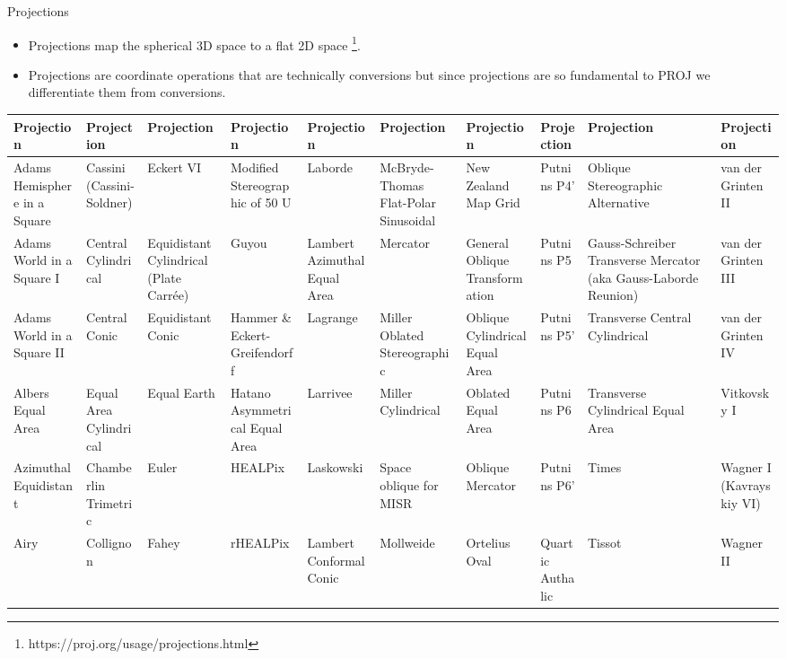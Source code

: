 \documentclass[11pt,dvipsnames,ignorenonframetext,aspectratio=169]{beamer}
\providecommand{\tightlist}{%
  \setlength{\itemsep}{0pt}\setlength{\parskip}{0pt}}
\begin{document}
\begin{frame}{Projections}
\protect\hypertarget{projections}{}
\begin{itemize}
\tightlist
\item
  Projections map the spherical 3D space to a flat 2D space
  \footnote[frame]{https://proj.org/usage/projections.html}.
\item
  Projections are coordinate operations that are technically conversions
  but since projections are so fundamental to PROJ we differentiate them
  from conversions.
\end{itemize}

\setlength{\tabcolsep}{2pt}

\begin{table}
\centering\begingroup\fontsize{4}{6}\selectfont

\begin{tabular}{>{\raggedright\arraybackslash}p{8em}>{\raggedright\arraybackslash}p{8em}>{\raggedright\arraybackslash}p{8em}>{\raggedright\arraybackslash}p{8em}>{\raggedright\arraybackslash}p{8em}>{\raggedright\arraybackslash}p{8em}>{\raggedright\arraybackslash}p{8em}>{\raggedright\arraybackslash}p{8em}>{\raggedright\arraybackslash}p{8em}>{\raggedright\arraybackslash}p{8em}}
\toprule
Projection & Projection & Projection & Projection & Projection & Projection & Projection & Projection & Projection & Projection\\
\midrule
Adams Hemisphere in a Square & Cassini (Cassini-Soldner) & Eckert VI & Modified Stereographic of 50 U & Laborde & McBryde-Thomas Flat-Polar Sinusoidal & New Zealand Map Grid & Putnins P4’ & Oblique Stereographic Alternative & van der Grinten II\\
Adams World in a Square I & Central Cylindrical & Equidistant Cylindrical (Plate Carrée) & Guyou & Lambert Azimuthal Equal Area & Mercator & General Oblique Transformation & Putnins P5 & Gauss-Schreiber Transverse Mercator (aka Gauss-Laborde Reunion) & van der Grinten III\\
Adams World in a Square II & Central Conic & Equidistant Conic & Hammer \& Eckert-Greifendorff & Lagrange & Miller Oblated Stereographic & Oblique Cylindrical Equal Area & Putnins P5’ & Transverse Central Cylindrical & van der Grinten IV\\
Albers Equal Area & Equal Area Cylindrical & Equal Earth & Hatano Asymmetrical Equal Area & Larrivee & Miller Cylindrical & Oblated Equal Area & Putnins P6 & Transverse Cylindrical Equal Area & Vitkovsky I\\
Azimuthal Equidistant & Chamberlin Trimetric & Euler & HEALPix & Laskowski & Space oblique for MISR & Oblique Mercator & Putnins P6’ & Times & Wagner I (Kavrayskiy VI)\\
\addlinespace
Airy & Collignon & Fahey & rHEALPix & Lambert Conformal Conic & Mollweide & Ortelius Oval & Quartic Authalic & Tissot & Wagner II\\
\bottomrule
\end{tabular}
\endgroup{}
\end{table}
\end{frame}
\end{document}
